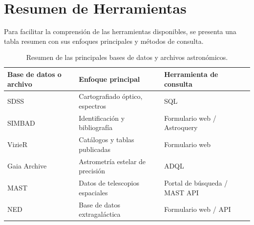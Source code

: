 \section{Resumen de Herramientas}

Para facilitar la comprensión de las herramientas disponibles, se presenta una tabla resumen con sus enfoques principales y métodos de consulta.

\begin{table}[H]
\centering
\small
\begin{tabular}{@{}p{}p{}p{}@{}}
\toprule
\textbf{Base de datos o archivo} & \textbf{Enfoque principal} & \textbf{Herramienta de consulta} \\
\midrule
SDSS & Cartografiado óptico, espectros & SQL \\
SIMBAD & Identificación y bibliografía & Formulario web / Astroquery \\
VizieR & Catálogos y tablas publicadas & Formulario web \\
Gaia Archive & Astrometría estelar de precisión & ADQL \\
MAST & Datos de telescopios espaciales & Portal de búsqueda / MAST API \\
NED & Base de datos extragaláctica & Formulario web / API \\
\bottomrule
\end{tabular}
\caption{Resumen de las principales bases de datos y archivos astronómicos.}
\end{table}